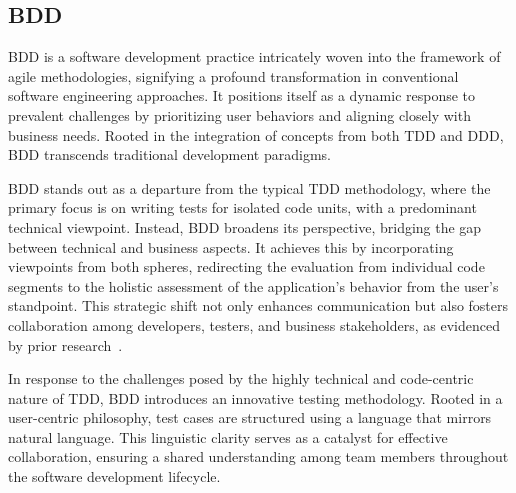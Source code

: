 \subsection{\acl{BDD}}
\label{subsec:bdd}



\acf{BDD} is a software development practice intricately woven into the framework of agile methodologies, signifying a profound transformation in conventional software engineering approaches. It positions itself as a dynamic response to prevalent challenges by prioritizing user behaviors and aligning closely with business needs. Rooted in the integration of concepts from both \ac{TDD} and \ac{DDD}, \ac{BDD} transcends traditional development paradigms.

\ac{BDD} stands out as a departure from the typical \ac{TDD} methodology, where the primary focus is on writing tests for isolated code units, with a predominant technical viewpoint. Instead, \ac{BDD} broadens its perspective, bridging the gap between technical and business aspects. It achieves this by incorporating viewpoints from both spheres, redirecting the evaluation from individual code segments to the holistic assessment of the application's behavior from the user's standpoint. This strategic shift not only enhances communication but also fosters collaboration among developers, testers, and business stakeholders, as evidenced by prior research~\cite{smart2023bdd,pereira2018behavior}.

In response to the challenges posed by the highly technical and code-centric nature of \ac{TDD}, \ac{BDD} introduces an innovative testing methodology. Rooted in a user-centric philosophy, test cases are structured using a language that mirrors natural language. This linguistic clarity serves as a catalyst for effective collaboration, ensuring a shared understanding among team members throughout the software development lifecycle.

